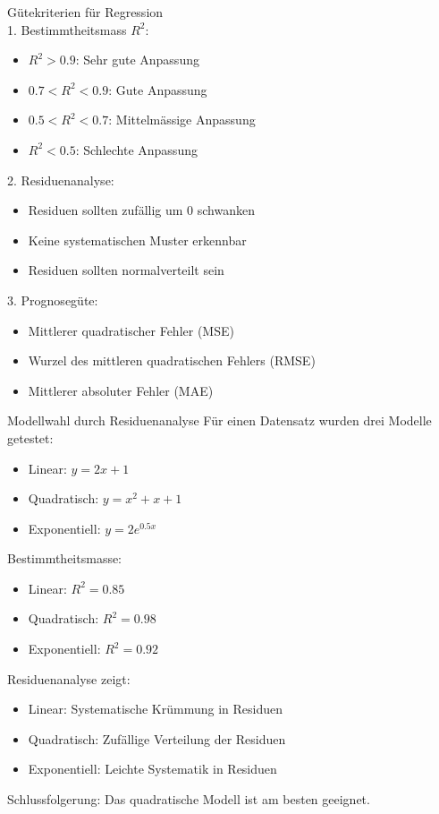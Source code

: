 \begin{concept}{Gütekriterien für Regression}\\
1. Bestimmtheitsmass $R^2$:
   \begin{itemize}
     \item $R^2 > 0.9$: Sehr gute Anpassung
     \item $0.7 < R^2 < 0.9$: Gute Anpassung
     \item $0.5 < R^2 < 0.7$: Mittelmässige Anpassung
     \item $R^2 < 0.5$: Schlechte Anpassung
   \end{itemize}

2. Residuenanalyse:
   \begin{itemize}
     \item Residuen sollten zufällig um 0 schwanken
     \item Keine systematischen Muster erkennbar
     \item Residuen sollten normalverteilt sein
   \end{itemize}

3. Prognosegüte:
   \begin{itemize}
     \item Mittlerer quadratischer Fehler (MSE)
     \item Wurzel des mittleren quadratischen Fehlers (RMSE)
     \item Mittlerer absoluter Fehler (MAE)
   \end{itemize}
\end{concept}

\begin{example2}{Modellwahl durch Residuenanalyse}
Für einen Datensatz wurden drei Modelle getestet:
\begin{itemize}
  \item Linear: $y = 2x + 1$
  \item Quadratisch: $y = x^2 + x + 1$
  \item Exponentiell: $y = 2e^{0.5x}$
\end{itemize}

Bestimmtheitsmasse:
\begin{itemize}
  \item Linear: $R^2 = 0.85$
  \item Quadratisch: $R^2 = 0.98$
  \item Exponentiell: $R^2 = 0.92$
\end{itemize}

Residuenanalyse zeigt:
\begin{itemize}
  \item Linear: Systematische Krümmung in Residuen
  \item Quadratisch: Zufällige Verteilung der Residuen
  \item Exponentiell: Leichte Systematik in Residuen
\end{itemize}

Schlussfolgerung: Das quadratische Modell ist am besten geeignet.
\end{example2}

